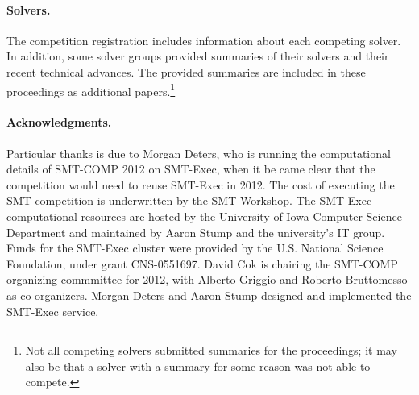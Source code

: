 \documentclass{llncs}
\begin{document}
\paragraph{Solvers.} The competition registration includes information about each competing solver. In addition, some solver groups provided summaries of their solvers and their recent technical advances. The provided summaries are included in these proceedings as additional papers.\footnote{Not all competing solvers submitted summaries for the proceedings; it may also be that a solver with a summary for some reason was not able to compete.}

\paragraph{Acknowledgments.} Particular thanks is due to Morgan Deters, who is running the computational details of
 SMT-COMP 2012 on SMT-Exec, when it be came clear that the competition would need to reuse SMT-Exec in 2012.
The cost of executing the SMT competition is underwritten by the SMT Workshop. The SMT-Exec computational resources are hosted by the University of Iowa Computer Science Department and maintained by Aaron Stump and the university's IT group. Funds for the SMT-Exec cluster were provided by the U.S. National Science Foundation, under grant CNS-0551697. David Cok is chairing the SMT-COMP organizing commmittee for 2012, with Alberto Griggio and Roberto Bruttomesso as co-organizers. Morgan Deters and Aaron Stump designed and
implemented the SMT-Exec service. 



\end{document}
